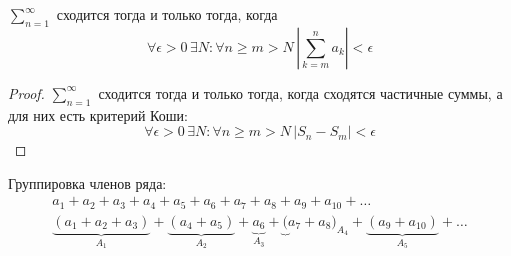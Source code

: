 \begin{theorem}
	$\sum_{n=1}^\infty$ сходится тогда и только тогда, когда
	\[ \forall \epsilon > 0\, \exists N\colon \forall n \ge m > N\, \left|\sum_{k=m}^n a_k\right| < \epsilon \]
\end{theorem}
\begin{proof}
	$\sum_{n=1}^\infty$ сходится тогда и только тогда, когда сходятся частичные суммы, а для них есть критерий Коши:
	\[ \forall \epsilon > 0\, \exists N\colon \forall n \ge m > N\, \left|S_n - S_m\right| < \epsilon \]
\end{proof}

\begin{Def}
	Группировка членов ряда:
	\begin{gather*}
		a_1 + a_2 + a_3 + a_4 + a_5 + a_6 + a_7 + a_8 + a_9 + a_{10} + \ldots \\
		\underbrace{(a_1 + a_2 + a_3)}_{A_1}
		+ \underbrace{(a_4 + a_5)}_{A_2}
		+ \underbrace{a_6}_{A_3}
		+ \underbrace(a_7 + a_8)_{A_4}
		+ \underbrace{(a_9 + a_{10})}_{A_5} + \ldots
	\end{gather*}
\end{Def}

